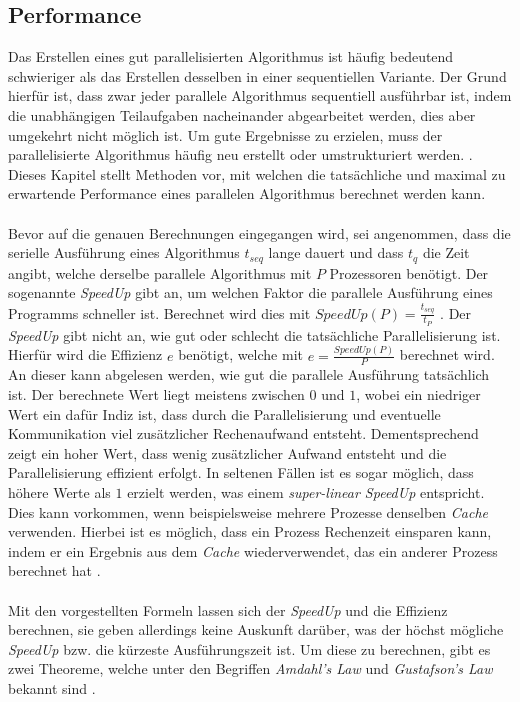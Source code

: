 \subsection{Performance}
\label{subsec:basics_performance}
Das Erstellen eines gut parallelisierten Algorithmus ist häufig bedeutend schwieriger als das Erstellen desselben in einer sequentiellen Variante. Der Grund hierfür ist, dass zwar jeder parallele Algorithmus sequentiell ausführbar ist, indem die unabhängigen Teilaufgaben nacheinander abgearbeitet werden, dies aber umgekehrt nicht möglich ist. Um gute Ergebnisse zu erzielen, muss der parallelisierte Algorithmus häufig neu erstellt oder umstrukturiert werden. \cite{nielsen2016introduction}. Dieses Kapitel stellt Methoden vor, mit welchen die tatsächliche und maximal zu erwartende Performance eines parallelen Algorithmus berechnet werden kann. 
\\\\
Bevor auf die genauen Berechnungen eingegangen wird, sei angenommen, dass die serielle Ausführung eines Algorithmus $t_{seq}$ lange dauert und dass $t_q$ die Zeit angibt, welche derselbe parallele Algorithmus mit $P$ Prozessoren benötigt. Der sogenannte \emph{SpeedUp} gibt an, um welchen Faktor die parallele Ausführung eines Programms schneller ist. Berechnet wird dies mit $SpeedUp(P)=\frac{t_{seq}}{t_P}$ \cite{nielsen2016introduction}. Der \emph{SpeedUp} gibt nicht an, wie gut oder schlecht die tatsächliche Parallelisierung ist. Hierfür wird die Effizienz $e$ benötigt, welche mit $e=\frac{SpeedUp(P)}{P}$ berechnet wird. An dieser kann abgelesen werden, wie gut die parallele Ausführung tatsächlich ist. Der berechnete Wert liegt meistens zwischen $0$ und $1$, wobei ein niedriger Wert ein dafür Indiz ist, dass durch die Parallelisierung und eventuelle Kommunikation viel zusätzlicher Rechenaufwand entsteht. Dementsprechend zeigt ein hoher Wert, dass wenig zusätzlicher Aufwand entsteht und die Parallelisierung effizient erfolgt. In seltenen Fällen ist es sogar möglich, dass höhere Werte als $1$ erzielt werden, was einem \emph{super-linear SpeedUp} entspricht. Dies kann vorkommen, wenn beispielsweise mehrere Prozesse denselben \emph{Cache} verwenden. Hierbei ist es möglich, dass ein Prozess Rechenzeit einsparen kann, indem er ein Ergebnis aus dem \emph{Cache} wiederverwendet, das ein anderer Prozess berechnet hat \cite{nielsen2016introduction}.
\\\\
Mit den vorgestellten Formeln lassen sich der \emph{SpeedUp} und die Effizienz berechnen, sie geben allerdings keine Auskunft darüber, was der höchst mögliche \emph{SpeedUp} bzw. die kürzeste Ausführungszeit ist. Um diese zu berechnen, gibt es zwei Theoreme, welche unter den Begriffen \emph{Amdahl's Law} und \emph{Gustafson's Law} bekannt sind \cite{nielsen2016introduction}. 
